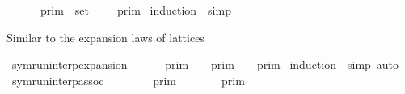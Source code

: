 \begin{isabellebody}
\ \ {\isacartoucheopen}{\isasymInter}\ {\isacharparenleft}{\isacharparenleft}{\isasymlambda}{\isasymgamma}{\isachardot}\ {\isasymlbrakk}\ {\isasymgamma}\ {\isasymrbrakk}\isactrlsub p\isactrlsub r\isactrlsub i\isactrlsub m{\isacharparenright}\ {\isacharbackquote}\ set\ {\isasymGamma}{\isacharparenright}\ {\isacharequal}\ {\isasymlbrakk}{\isasymlbrakk}\ {\isasymGamma}\ {\isasymrbrakk}{\isasymrbrakk}\isactrlsub p\isactrlsub r\isactrlsub i\isactrlsub m{\isacartoucheclose}\isanewline
%
\isadelimproof
%
\endisadelimproof
%
\isatagproof
{}\isamarkupfalse%
\ {\isacharparenleft}induction\ {\isasymGamma}{\isacharcomma}\ simp{\isacharplus}{\isacharparenright}%
\endisatagproof
{\isafoldproof}%
%
\isadelimproof
%
\endisadelimproof
%
\isadelimdocument
%
\endisadelimdocument
%
\isatagdocument
%
\isamarkuptrue%
%
\endisatagdocument
{\isafolddocument}%
%
\isadelimdocument
%
\endisadelimdocument
%
\begin{isamarkuptext}%
Similar to the expansion laws of lattices%
\end{isamarkuptext}\isamarkuptrue%
\isamarkupfalse%
\ symrun{\isacharunderscore}interp{\isacharunderscore}expansion{\isacharcolon}\isanewline
\ \ {\isacartoucheopen}{\isasymlbrakk}{\isasymlbrakk}\ {\isasymGamma}\ {\isacharat}\ {\isasymGamma}\ {\isasymrbrakk}{\isasymrbrakk}\isactrlsub p\isactrlsub r\isactrlsub i\isactrlsub m\ {\isacharequal}\ {\isasymlbrakk}{\isasymlbrakk}\ {\isasymGamma}\ {\isasymrbrakk}{\isasymrbrakk}\isactrlsub p\isactrlsub r\isactrlsub i\isactrlsub m\ {\isasyminter}\ {\isasymlbrakk}{\isasymlbrakk}\ {\isasymGamma}\ {\isasymrbrakk}{\isasymrbrakk}\isactrlsub p\isactrlsub r\isactrlsub i\isactrlsub m{\isacartoucheclose}\isanewline
%
\isadelimproof
%
\endisadelimproof
%
\isatagproof
{}\isamarkupfalse%
\ {\isacharparenleft}induction\ {\isasymGamma}\ simp{\isacharcomma}\ auto{\isacharparenright}%
\endisatagproof
{\isafoldproof}%
%
\isadelimproof
%
\endisadelimproof
%
\isadelimdocument
%
\endisadelimdocument
%
\isatagdocument
%
\isamarkuptrue%
%
\isamarkuptrue%
%
\endisatagdocument
{\isafolddocument}%
%
\isadelimdocument
%
\endisadelimdocument
{}\isamarkupfalse%
\ symrun{\isacharunderscore}interp{\isacharunderscore}assoc{\isacharcolon}\isanewline
\ \ {\isacartoucheopen}{\isasymlbrakk}{\isasymlbrakk}\ {\isacharparenleft}{\isasymGamma}\ {\isacharat}\ {\isasymGamma}\ {\isacharat}\ {\isasymGamma}\ {\isasymrbrakk}{\isasymrbrakk}\isactrlsub p\isactrlsub r\isactrlsub i\isactrlsub m\ {\isacharequal}\ {\isasymlbrakk}{\isasymlbrakk}\ {\isasymGamma}\ {\isacharat}\ {\isacharparenleft}{\isasymGamma}\ {\isacharat}\ {\isasymGamma}\ {\isasymrbrakk}{\isasymrbrakk}\isactrlsub p\isactrlsub r\isactrlsub i\isactrlsub m{\isacartoucheclose}\isanewline

\end{isabellebody}
